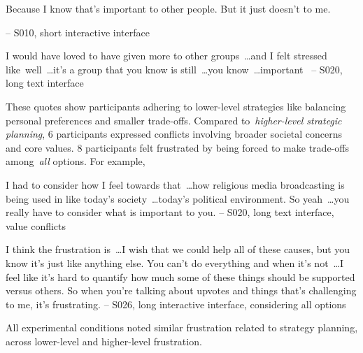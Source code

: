 \begin{displayquote}
Because I know that's important to other people. But it just doesn't to me.
    
\noindent \hfill -- S010, short interactive interface
\end{displayquote}

\begin{displayquote}
I would have loved to have given more to other groups~\ldots and I felt stressed like~\bracketellipsis well~\ldots it's a group that you know is still~\ldots you know~\ldots important~\bracketellipsis
\noindent \hfill -- S020, long text interface
\end{displayquote}

These quotes show participants adhering to lower-level strategies like balancing personal preferences and smaller trade-offs. Compared to~\textit{higher-level strategic planning}, $6$ participants expressed conflicts involving broader societal concerns and core values. $8$ participants felt frustrated by being forced to make trade-offs among~\textit{all} options. For example,

\begin{displayquote}
I had to consider how I feel towards that~\ldots how religious media broadcasting is being used in like today's society~\ldots today's political environment. So yeah~\ldots you really have to consider what is important to you. 
\noindent \hfill -- S020, long text interface, value conflicts
\end{displayquote}

\begin{displayquote}
I think the frustration is~\ldots I wish that we could help all of these causes, but you know it's just like anything else. You can't do everything and when it's not~\ldots  I feel like it's hard to quantify how much some of these things should be supported versus others. So when you're talking about upvotes and things that's challenging to me, it's frustrating.
\noindent \hfill -- S026, long interactive interface, considering all options
\end{displayquote}

All experimental conditions noted similar frustration related to strategy planning, across lower-level and higher-level frustration.

